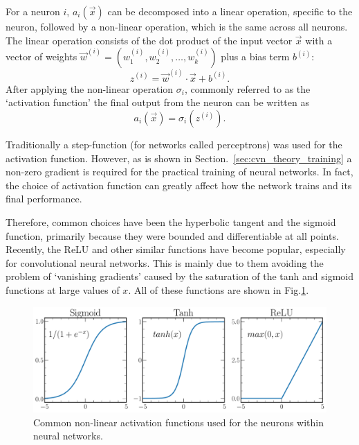For a neuron $i$, $a_{i}(\vec{x})$ can be decomposed into a linear operation, specific to the
neuron, followed by a non-linear operation, which is the same across all neurons. The linear
operation consists of the dot product of the input vector $\vec{x}$ with a vector of weights
$\vec{w}^{(i)} = (w_{1}^{(i)}, w_{2}^{(i)},\dots,w_{k}^{(i)})$ plus a bias term $b^{(i)}$:
\begin{equation} %
    z^{(i)}=\vec{w}^{(i)}\cdot\vec{x}+b^{(i)}.
    \label{eq:network}
\end{equation}
After applying the non-linear operation $\sigma_{i}$, commonly referred to as the `activation
function' the final output from the neuron can be written as
\begin{equation} %
    a_{i}(\vec{x})=\sigma_{i}(z^{(i)}).
    \label{eq:activation}
\end{equation}

Traditionally a step-function (for networks called perceptrons) was used for the activation
function. However, as is shown in Section.~\ref{sec:cvn_theory_training} a non-zero gradient is
required for the practical training of neural networks. In fact, the choice of activation function
can greatly affect how the network trains and its final performance.

Therefore, common choices have been the hyperbolic tangent and the sigmoid function, primarily
because they were bounded and differentiable at all points. Recently, the ReLU and other similar functions have become popular, especially for convolutional neural networks. This is mainly due to them avoiding the problem of `vanishing gradients' caused by the saturation of the
tanh and sigmoid functions at large values of $x$. All of these functions are shown in
Fig.\ref{fig:activations}.

\begin{figure} %
    \includegraphics[width=\textwidth]{diagrams/7-cvn/activations.pdf}
    \caption[Common non-linear activation functions.]
    {Common non-linear activation functions used for the neurons within neural networks.}
    \label{fig:activations}
\end{figure}

